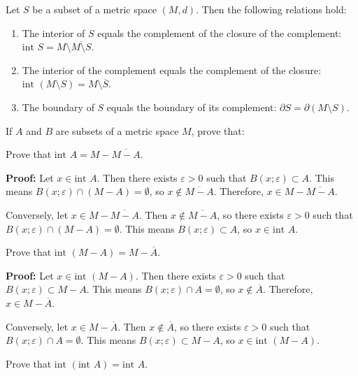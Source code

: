 \begin{theorem}
Let $S$ be a subset of a metric space $(M,d)$. Then the following relations hold:
\begin{enumerate}
\item The interior of $S$ equals the complement of the closure of the complement: $\text{int } S = M \setminus \overline{M \setminus S}$.
\item The interior of the complement equals the complement of the closure: $\text{int }(M \setminus S) = M \setminus \overline{S}$.
\item The boundary of $S$ equals the boundary of its complement: $\partial S = \partial(M \setminus S)$.
\end{enumerate}
\end{theorem}

If $A$ and $B$ are subsets of a metric space $M$, prove that:

\begin{problembox}
Prove that \(\text{int } A = M - \overline{M - A}\).
\end{problembox}

\textbf{Proof:} Let $x \in \text{int } A$. Then there exists $\varepsilon > 0$ such that $B(x;\varepsilon) \subset A$. This means $B(x;\varepsilon) \cap (M - A) = \emptyset$, so $x \notin \overline{M - A}$. Therefore, $x \in M - \overline{M - A}$.

Conversely, let $x \in M - \overline{M - A}$. Then $x \notin \overline{M - A}$, so there exists $\varepsilon > 0$ such that $B(x;\varepsilon) \cap (M - A) = \emptyset$. This means $B(x;\varepsilon) \subset A$, so $x \in \text{int } A$.

\begin{problembox}
Prove that \(\text{int }(M - A) = M - \overline{A}\).
\end{problembox}

\textbf{Proof:} Let $x \in \text{int }(M - A)$. Then there exists $\varepsilon > 0$ such that $B(x;\varepsilon) \subset M - A$. This means $B(x;\varepsilon) \cap A = \emptyset$, so $x \notin \overline{A}$. Therefore, $x \in M - \overline{A}$.

Conversely, let $x \in M - \overline{A}$. Then $x \notin \overline{A}$, so there exists $\varepsilon > 0$ such that $B(x;\varepsilon) \cap A = \emptyset$. This means $B(x;\varepsilon) \subset M - A$, so $x \in \text{int }(M - A)$.

\begin{problembox}
Prove that \(\text{int }(\text{int } A) = \text{int } A\).
\end{problembox}

